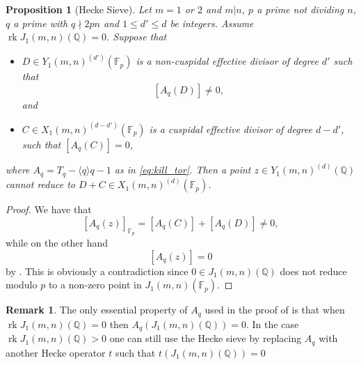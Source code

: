 \documentclass[11pt,reqno]{amsart}
\DeclareMathOperator{\rk}{rk}
\newtheorem{proposition}[theorem]{Proposition}
\theoremstyle{definition}
\newtheorem{remark}[theorem]{Remark}
\numberwithin{equation}{section}
\newcommand{\Q}{\mathbb{Q}}
\newcommand{\F}{\mathbb{F}}
\newcommand{\diamondop}[1]{\langle #1 \rangle} %
\begin{document}
\begin{proposition}[Hecke Sieve] \label{prop:hecke_sieve} Let $m=1$ or $2$ and $m|n$, $p$ a prime not dividing $n$, $q$ a prime with $q\nmid 2pn$ and $1 \leq d'\leq d$ be integers. Assume $\rk J_1(m,n)(\Q)=0$. Suppose that 
\begin{itemize}


    \item[i)] $D\in Y_1(m,n)^{(d')}(\F_p)$ is a non-cuspidal effective divisor of degree $d'$ such that
    $$[A_{q}(D)]\neq 0,$$ and

    \item[ii)] $C \in X_1(m,n)^{(d-d')}(\F_p)$ is a cuspidal effective divisor of degree $d-d'$, such that $[A_{q}(C)]= 0$,
\end{itemize}
where $A_q=T_q-\diamondop{q}q-1$ as in \cref{eq:kill_tor}. Then a point $z \in Y_1(m,n)^{(d)}(\Q)$ cannot reduce to $D+C \in X_1(m,n)^{(d)}(\F_p)$.
\end{proposition}
\begin{proof} We have that 
$$[A_q(z)]_{\F_p}=[A_q(C)]+[A_q(D)]\neq 0,$$
while on the other hand 
$$[A_q(z)]=0$$
by . This is obviously a contradiction since $0\in J_1(m,n)(\Q)$ does not reduce modulo $p$ to a non-zero point in $J_1(m,n)(\F_p)$. 
\end{proof}
\begin{remark}
The only essential property of $A_q$ used in the proof of  is that when $\rk J_1(m,n)(\Q)=0$ then $A_q(J_1(m,n)(\Q))=0$. In the case $\rk J_1(m,n)(\Q)>0$ one can still use the Hecke sieve by replacing $A_q$ with another Hecke operator $t$ such that $t(J_1(m,n)(\Q))=0$
\end{remark}
\end{document}
